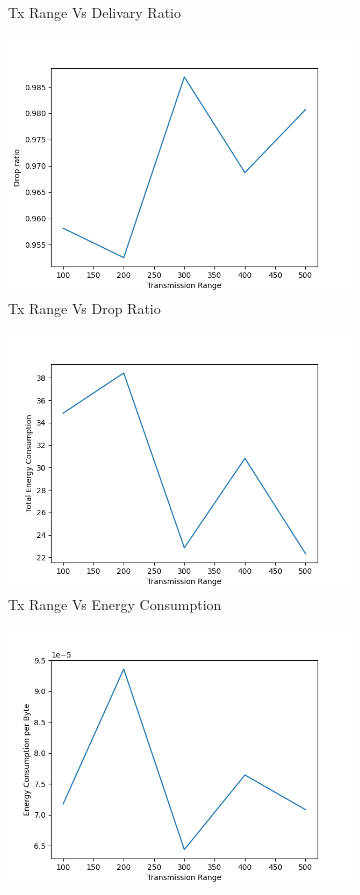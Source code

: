\begin{figure}[h]
\begin{subfigure}{.5\textwidth}
     \caption{Tx Range Vs Delivary Ratio}
     \label{tx_range_delivery}
\end{subfigure}
\begin{subfigure}{.5\textwidth}
  \centering
  \includegraphics[width=.8\linewidth]{_15_4_static/TransmissionRangevsDropRatio.png}
     \caption{Tx Range Vs Drop Ratio}
     \label{tx_range_drop}
\end{subfigure}
\begin{subfigure}{.5\textwidth}
  \centering
  \includegraphics[width=.8\linewidth]{_15_4_static/TransmissionRangevsTotalEnergyConsumption.png}
     \caption{Tx Range Vs Energy Consumption}
     \label{tx_range_energy}
\end{subfigure}
\begin{subfigure}{.5\textwidth}
  \centering
  \includegraphics[width=.8\linewidth]{_15_4_static/TransmissionRangevsEnergyConsumptionperByte.png}

\end{subfigure}
\end{figure}
